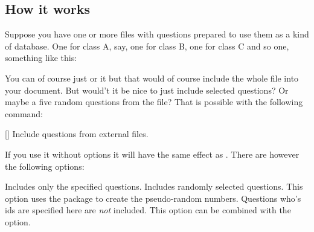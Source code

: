 \documentclass[load-preamble+,scrartcl={DIV10}]{cnltx-doc}
\begin{document}
\subsection{How it works}
Suppose you have one or more files with questions prepared to use them as a
kind of database.  One for class A, say, one for class B, one for class C and
so one, something like this:
You can of course just  or  it but that would of
course include the whole file into your document.  But would't it be nice to
just include selected questions?  Or maybe a five random questions from the
file?  That is possible with the following command:
\begin{commands}
  []
    Include questions from external files.
\end{commands}
If you use it without options it will have the same effect as .
There are however the following options:
\begin{options}
  \Default
    Includes only the specified questions.
  \Default
    Includes  randomly selected questions.  This option uses the
     package to create the pseudo-random numbers.
  \Default
    Questions who's \acp{id} are specified here are \emph{not} included.  This
    option can be combined with the  option.
\end{options}
\end{document}
